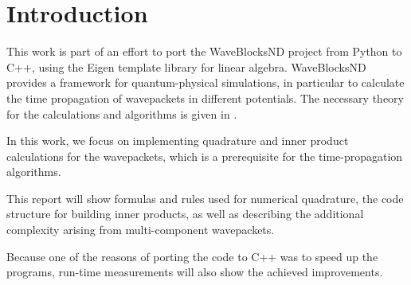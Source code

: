 \section{Introduction}

This work is part of an effort to port the WaveBlocksND project
\cite{waveblocksnd} from Python to C++, using the Eigen template library for
linear algebra.
WaveBlocksND provides a framework for quantum-physical simulations, in
particular to calculate the time propagation of wavepackets in different
potentials.
The necessary theory for the calculations and algorithms is given in
\cite{B_master_thesis}.

In this work, we focus on implementing quadrature and inner product calculations
for the wavepackets, which is a prerequisite for the time-propagation
algorithms.

This report will show formulas and rules used for numerical quadrature,
the code structure for building inner products, as well as describing the
additional complexity arising from multi-component wavepackets.

Because one of the reasons of porting the code to C++ was to speed up the
programs, run-time measurements will also show the achieved improvements.
